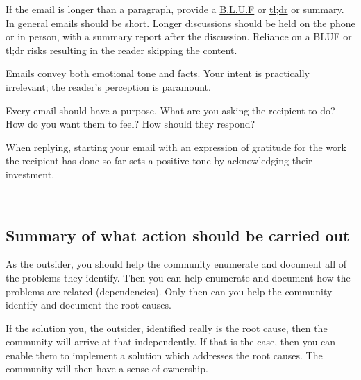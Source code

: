 If the email is longer than a paragraph, provide a \href{https://en.wikipedia.org/wiki/BLUF_(communication)}{B.L.U.F} or \href{https://en.wikipedia.org/wiki/Wikipedia:Too_long;_didn\%27t_read}{tl;dr} or summary. In general emails should be short. Longer discussions should be held on the phone or in person, with a summary report after the discussion. Reliance on a BLUF or tl;dr risks resulting in the reader skipping the content. 

Emails convey both emotional tone and facts. Your intent is practically irrelevant; the reader's perception is paramount. 

Every email should have a purpose. What are you asking the recipient to do? How do you want them to feel? How should they respond?

When replying, starting your email with an expression of gratitude for the work the recipient has done so far sets a positive tone by acknowledging their investment.

\ \\

\subsection*{Summary of what action should be carried out} 

As the outsider, you should help the community enumerate and document all of the problems they identify. Then you can help enumerate and document how the problems are related (dependencies). Only then can you help the community identify and document the root causes.

If the solution you, the outsider, identified really is the root cause, then the community will arrive at that independently. If that is the case, then you can enable them to implement a solution which addresses the root causes. The community will then have a sense of ownership.
